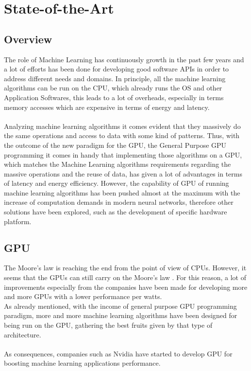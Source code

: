 \chapter{State-of-the-Art}
\section{Overview}
The role of Machine Learning has continuously growth in the past few years and a lot of efforts has been done for developing good software APIs in order to address different needs and domains. \newline In principle, all the machine learning algorithms can be run on the CPU, which already runs the OS and other Application Softwares, this leads to a lot of overheads, especially in terms memory accesses which are expensive in terms of energy and latency. \\\\
Analyzing machine learning algorithms it comes evident that they massively do the same operations and access to data with some kind of patterns. Thus, with the outcome of the new paradigm for the GPU, the General Purpose GPU programming it comes in handy that implementing those algorithms on a GPU, which matches the Machine Learning algorithms requirements regarding the massive operations and the reuse of data, has given a lot of advantages in terms of latency and energy efficiency. However, the capability of GPU of running machine learning algorithms has been pushed almost at the maximum with the increase of computation demands in modern neural networks, therefore other solutions have been explored, such as the development of specific hardware platform.

\section{GPU}
The Moore's law is reaching the end from the point of view of CPUs. However, it seems that the GPUs can still carry on the Moore's law \cite{5496638}.\newline
For this reason, a lot of improvements especially from the companies have been made for developing more and more GPUs with a lower performance per watts.\\
As already mentioned, with the income of general purpose GPU programming paradigm, more and more machine learning algorithms have been designed for being run on the GPU, gathering the best fruits given by that type of architecture.\\\\
As consequences, companies such as Nvidia have started to develop GPU for boosting machine learning applications performance.
